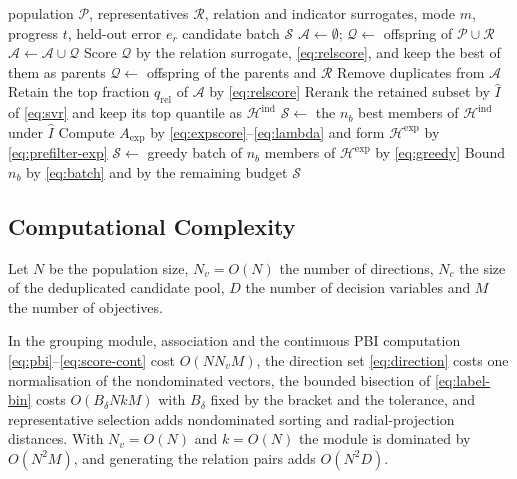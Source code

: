 \documentclass[final,5p,times,twocolumn]{elsarticle}
\begin{document}
\begin{algorithm}[t]
\caption{Dual-mode candidate selection}
\label{alg:candidate}
\begin{algorithmic}[1]
\Require population $\mathcal{P}$, representatives $\mathcal{R}$, relation and
         indicator surrogates, mode $m$, progress $t$, held-out error $e_r$
\Ensure candidate batch $\mathcal{S}$
\State $\mathcal{A}\gets\emptyset$;
       $\mathcal{Q}\gets$ offspring of $\mathcal{P}\cup\mathcal{R}$
  \State $\mathcal{A}\gets\mathcal{A}\cup\mathcal{Q}$
  \State Score $\mathcal{Q}$ by the relation surrogate, \eqref{eq:relscore},
         and keep the best of them as parents
  \State $\mathcal{Q}\gets$ offspring of the parents and $\mathcal{R}$
\EndWhile
\State Remove duplicates from $\mathcal{A}$
  \State Retain the top fraction $q_{\mathrm{rel}}$ of $\mathcal{A}$ by
         \eqref{eq:relscore}
  \State Rerank the retained subset by $\widehat I$ of \eqref{eq:svr} and keep
         its top quantile as $\mathcal{H}^{\mathrm{ind}}$
  \State $\mathcal{S}\gets$ the $n_b$ best members of
         $\mathcal{H}^{\mathrm{ind}}$ under $\widehat I$
\Else
  \State Compute $A_{\mathrm{exp}}$ by \eqref{eq:expscore}--\eqref{eq:lambda}
         and form $\mathcal{H}^{\mathrm{exp}}$ by \eqref{eq:prefilter-exp}
  \State $\mathcal{S}\gets$ greedy batch of $n_b$ members of
         $\mathcal{H}^{\mathrm{exp}}$ by \eqref{eq:greedy}
\EndIf
\State Bound $n_b$ by \eqref{eq:batch} and by the remaining budget
\State \Return $\mathcal{S}$
\end{algorithmic}
\end{algorithm}

\subsection{Computational Complexity}
\label{sec:method:complexity}

Let $N$ be the population size, $N_v=O(N)$ the number of directions, $N_c$ the
size of the deduplicated candidate pool, $D$ the number of decision variables
and $M$ the number of objectives.

In the grouping module, association and the continuous PBI computation
\eqref{eq:pbi}--\eqref{eq:score-cont} cost $O(NN_vM)$, the direction set
\eqref{eq:direction} costs one normalisation of the nondominated vectors, the
bounded bisection of \eqref{eq:label-bin} costs $O(B_\delta NkM)$ with
$B_\delta$ fixed by the bracket and the tolerance, and representative selection
adds nondominated sorting and radial-projection distances. With $N_v=O(N)$ and
$k=O(N)$ the module is dominated by $O(N^2M)$, and generating the relation pairs
adds $O(N^2D)$.
\end{document}
